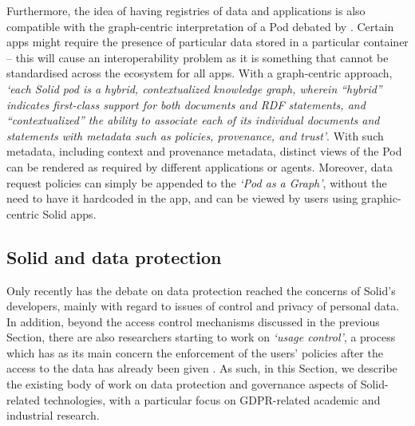 Furthermore, the idea of having registries of data and applications is also compatible with the graph-centric interpretation of a Pod debated by \cite{dedecker_whats_2022}. Certain apps might require the presence of particular data stored in a particular container -- this will cause an interoperability problem as it is something that cannot be standardised across the ecosystem for all apps.
With a graph-centric approach, \textit{`each Solid pod is a hybrid, contextualized knowledge graph, wherein ``hybrid'' indicates first-class support for both documents and RDF statements, and ``contextualized'' the ability to associate each of its individual documents and statements with metadata such as policies, provenance, and trust'}.
With such metadata, including context and provenance metadata, distinct views of the Pod can be rendered as required by different applications or agents.
Moreover, data request policies can simply be appended to the \textit{`Pod as a Graph'}, without the need to have it hardcoded in the app, and can be viewed by users using graphic-centric Solid apps.

\subsection{Solid and data protection}
\label{sec:sota_solid_data_protection}

Only recently has the debate on data protection reached the concerns of Solid's developers, mainly with regard to issues of control and privacy of personal data.
In addition, beyond the access control mechanisms discussed in the previous Section, there are also researchers starting to work on \textit{`usage control'}, a process which has as its main concern the enforcement of the users' policies after the access to the data has already been given \citep{akaichi_semantic_2022,havur_greater_2020}.
As such, in this Section, we describe the existing body of work on data protection and governance aspects of Solid-related technologies, with a particular focus on GDPR-related academic and industrial research.

